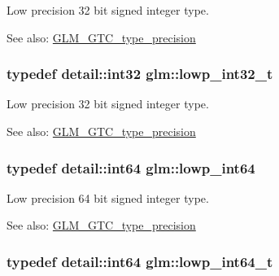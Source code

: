 Low precision 32 bit signed integer type. \begin{Desc}
\item[See also:]\hyperlink{group__gtc__type__precision}{GLM\_\-GTC\_\-type\_\-precision} \end{Desc}
\hypertarget{group__gtc__type__precision_gd9567c806dc39f534174eef42663119d}{
\subsubsection[lowp\_\-int32\_\-t]{\setlength{\rightskip}{0pt plus 5cm}typedef detail::int32 {\bf glm::lowp\_\-int32\_\-t}}}
\label{group__gtc__type__precision_gd9567c806dc39f534174eef42663119d}


Low precision 32 bit signed integer type. \begin{Desc}
\item[See also:]\hyperlink{group__gtc__type__precision}{GLM\_\-GTC\_\-type\_\-precision} \end{Desc}
\hypertarget{group__gtc__type__precision_gb8a8e75af347592406e41b3ae2c0712b}{
\subsubsection[lowp\_\-int64]{\setlength{\rightskip}{0pt plus 5cm}typedef detail::int64 {\bf glm::lowp\_\-int64}}}
\label{group__gtc__type__precision_gb8a8e75af347592406e41b3ae2c0712b}


Low precision 64 bit signed integer type. \begin{Desc}
\item[See also:]\hyperlink{group__gtc__type__precision}{GLM\_\-GTC\_\-type\_\-precision} \end{Desc}
\hypertarget{group__gtc__type__precision_g14d72e76d57c7f28eca8e933816c9fd6}{
\subsubsection[lowp\_\-int64\_\-t]{\setlength{\rightskip}{0pt plus 5cm}typedef detail::int64 {\bf glm::lowp\_\-int64\_\-t}}}
\label{group__gtc__type__precision_g14d72e76d57c7f28eca8e933816c9fd6}


